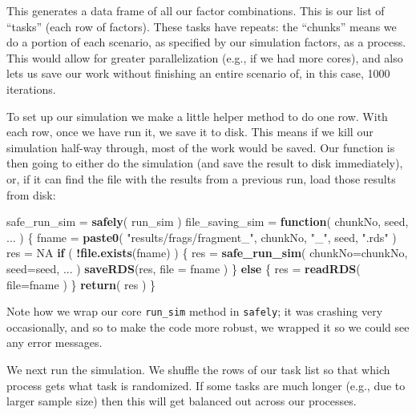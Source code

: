 \documentclass[
]{book}
\newenvironment{Shaded}{\begin{snugshade}}{\end{snugshade}}
\newcommand{\AttributeTok}[1]{\textcolor[rgb]{0.13,0.29,0.53}{#1}}
\newcommand{\ConstantTok}[1]{\textcolor[rgb]{0.56,0.35,0.01}{#1}}
\newcommand{\ControlFlowTok}[1]{\textcolor[rgb]{0.13,0.29,0.53}{\textbf{#1}}}
\newcommand{\FunctionTok}[1]{\textcolor[rgb]{0.13,0.29,0.53}{\textbf{#1}}}
\newcommand{\NormalTok}[1]{#1}
\newcommand{\OtherTok}[1]{\textcolor[rgb]{0.56,0.35,0.01}{#1}}
\newcommand{\SpecialCharTok}[1]{\textcolor[rgb]{0.81,0.36,0.00}{\textbf{#1}}}
\newcommand{\StringTok}[1]{\textcolor[rgb]{0.31,0.60,0.02}{#1}}
\begin{document}
This generates a data frame of all our factor combinations.
This is our list of ``tasks'' (each row of factors).
These tasks have repeats: the ``chunks'' means we do a portion of each scenario, as specified by our simulation factors, as a process.
This would allow for greater parallelization (e.g., if we had more cores), and also lets us save our work without finishing an entire scenario of, in this case, 1000 iterations.

To set up our simulation we make a little helper method to do one row.
With each row, once we have run it, we save it to disk.
This means if we kill our simulation half-way through, most of the work would be saved.
Our function is then going to either do the simulation (and save the result to disk immediately), or, if it can find the file with the results from a previous run, load those results from disk:

\begin{Shaded}
\begin{Highlighting}[]
\NormalTok{safe\_run\_sim }\OtherTok{=} \FunctionTok{safely}\NormalTok{( run\_sim )}
\NormalTok{file\_saving\_sim }\OtherTok{=} \ControlFlowTok{function}\NormalTok{( chunkNo, seed, ... ) \{}
\NormalTok{    fname }\OtherTok{=} \FunctionTok{paste0}\NormalTok{( }\StringTok{"results/frags/fragment\_"}\NormalTok{, chunkNo, }\StringTok{"\_"}\NormalTok{, seed, }\StringTok{".rds"}\NormalTok{ )}
\NormalTok{    res }\OtherTok{=} \ConstantTok{NA}
    \ControlFlowTok{if}\NormalTok{ ( }\SpecialCharTok{!}\FunctionTok{file.exists}\NormalTok{(fname) ) \{}
\NormalTok{        res }\OtherTok{=} \FunctionTok{safe\_run\_sim}\NormalTok{( }\AttributeTok{chunkNo=}\NormalTok{chunkNo, }\AttributeTok{seed=}\NormalTok{seed, ... )}
        \FunctionTok{saveRDS}\NormalTok{(res, }\AttributeTok{file =}\NormalTok{ fname )}
\NormalTok{    \} }\ControlFlowTok{else}\NormalTok{ \{}
\NormalTok{        res }\OtherTok{=} \FunctionTok{readRDS}\NormalTok{( }\AttributeTok{file=}\NormalTok{fname )}
\NormalTok{    \}}
    \FunctionTok{return}\NormalTok{( res )}
\NormalTok{\}}
\end{Highlighting}
\end{Shaded}

Note how we wrap our core \texttt{run\_sim} method in \texttt{safely}; it was crashing very occasionally, and so to make the code more robust, we wrapped it so we could see any error messages.

We next run the simulation.
We shuffle the rows of our task list so that which process gets what task is randomized.
If some tasks are much longer (e.g., due to larger sample size) then this will get balanced out across our processes.
\end{document}
